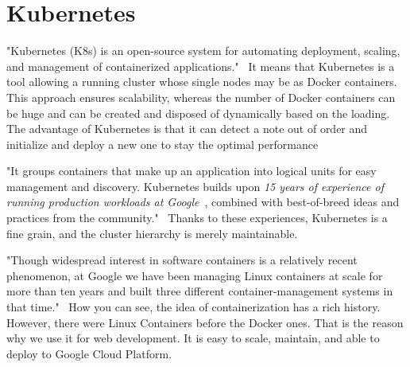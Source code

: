 \section{Kubernetes}\label{sec:kubernetes}
"Kubernetes (K8s) is an open-source system for automating deployment, scaling, and management of containerized applications."~\cite{kubernetes}
It means that Kubernetes is a tool allowing a running cluster whose single nodes may be as Docker containers.
This approach ensures scalability, whereas the number of Docker containers can be huge and can be created and disposed of dynamically based on the loading.
The advantage of Kubernetes is that it can detect a note out of order and initialize and deploy a new one to stay the optimal performance

"It groups containers that make up an application into logical units for easy management and discovery.
Kubernetes builds upon \textit{15 years of experience of running production workloads at Google}~\cite{kubernetesArticle}, combined with best-of-breed ideas and practices from the community."~\cite{kubernetes}
Thanks to these experiences, Kubernetes is a fine grain, and the cluster hierarchy is merely maintainable.

"Though widespread interest in software containers is a relatively recent phenomenon, at Google we have been managing Linux containers at scale for more than ten years and built three different container-management systems in that time."~\cite{kubernetesArticle}
How you can see, the idea of containerization has a rich history.
However, there were Linux Containers before the Docker ones.
That is the reason why we use it for web development.
It is easy to scale, maintain, and able to deploy to Google Cloud Platform.